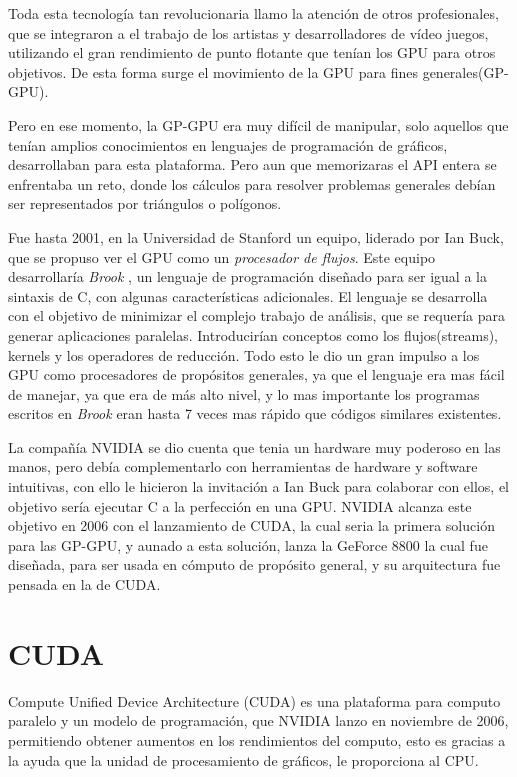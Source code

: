 Toda esta tecnología tan revolucionaria llamo la atención de otros profesionales, que se integraron a el trabajo de los artistas y desarrolladores de vídeo juegos, utilizando el gran rendimiento de punto flotante que tenían los GPU para otros objetivos. De esta forma surge el movimiento de la GPU para fines generales(GP-GPU).

Pero en ese momento, la GP-GPU era muy difícil de manipular, solo aquellos que tenían amplios conocimientos en lenguajes de programación de gráficos, desarrollaban para esta plataforma. Pero aun que memorizaras el API entera se enfrentaba un reto, donde los cálculos para resolver problemas generales debían ser representados por triángulos o polígonos.

Fue hasta 2001, en la Universidad de Stanford un equipo, liderado por Ian Buck, que se propuso ver el GPU como un  \textit{procesador de flujos}. Este equipo desarrollaría \textit{Brook} \cite{Buck2001}, un lenguaje de programación diseñado para ser igual a la sintaxis de C, con algunas características adicionales. El lenguaje se desarrolla con el objetivo de minimizar el complejo trabajo de análisis, que se requería para generar aplicaciones paralelas. Introducirían conceptos como los flujos(streams), kernels y los operadores de reducción. Todo esto le dio un gran impulso a los GPU como procesadores de propósitos generales, ya que el lenguaje era mas fácil de manejar, ya que era de más alto nivel, y lo mas importante los programas escritos en \textit{Brook} eran hasta 7 veces mas rápido que códigos similares existentes.

La compañía NVIDIA se dio cuenta que tenia un hardware muy poderoso en las manos, pero debía complementarlo con herramientas de hardware y software intuitivas, con ello le hicieron la invitación a Ian Buck para colaborar con ellos, el objetivo sería ejecutar C a la perfección en una GPU. NVIDIA alcanza este objetivo en 2006 con el lanzamiento de CUDA, la cual seria la primera solución para las GP-GPU, y aunado a esta solución, lanza la GeForce 8800 la cual fue diseñada, para ser usada en cómputo de propósito general, y su arquitectura fue pensada en la de CUDA. 

\pagebreak
\section{CUDA}
Compute Unified Device Architecture (CUDA) es una plataforma para computo paralelo y un modelo de programación, que NVIDIA lanzo en noviembre de 2006, permitiendo obtener aumentos en los rendimientos del computo, esto es gracias a la ayuda que la unidad de procesamiento de gráficos, le proporciona al CPU. 

